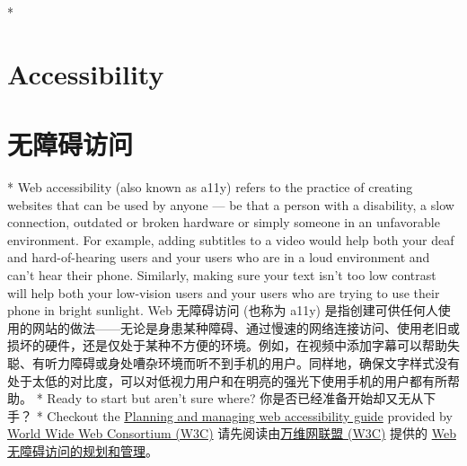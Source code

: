 
\begin{paracol}{2} 
\switchcolumn[0]*%
\section{Accessibility}
\switchcolumn
\section{无障碍访问}  
\switchcolumn[0]*%
Web accessibility (also known as a11y) refers to the practice of
creating websites that can be used by anyone --- be that a person with a
disability, a slow connection, outdated or broken hardware or simply
someone in an unfavorable environment. For example, adding subtitles to
a video would help both your deaf and hard-of-hearing users and your
users who are in a loud environment and can't hear their phone.
Similarly, making sure your text isn't too low contrast will help both
your low-vision users and your users who are trying to use their phone
in bright sunlight.
\switchcolumn
Web 无障碍访问 (也称为 a11y)
是指创建可供任何人使用的网站的做法------无论是身患某种障碍、通过慢速的网络连接访问、使用老旧或损坏的硬件，还是仅处于某种不方便的环境。例如，在视频中添加字幕可以帮助失聪、有听力障碍或身处嘈杂环境而听不到手机的用户。同样地，确保文字样式没有处于太低的对比度，可以对低视力用户和在明亮的强光下使用手机的用户都有所帮助。
\switchcolumn[0]*%
Ready to start but aren't sure where?
\switchcolumn
你是否已经准备开始却又无从下手？
\switchcolumn[0]*%
Checkout the
\href{https://www.w3.org/WAI/planning-and-managing/}{Planning and
managing web accessibility guide} provided by
\href{https://www.w3.org/}{World Wide Web Consortium (W3C)}
\switchcolumn
请先阅读由\href{https://www.w3.org/}{万维网联盟 (W3C)} 提供的
\href{https://www.w3.org/WAI/planning-and-managing/}{Web
无障碍访问的规划和管理}。
\end{paracol}



